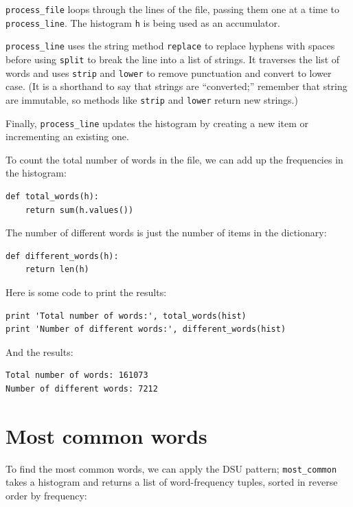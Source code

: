 
\verb"process_file" loops through the lines of the file,
passing them one at a time to \verb"process_line".  The histogram
{\tt h} is being used as an accumulator.


\verb"process_line" uses the string method {\tt replace} to replace
hyphens with spaces before using {\tt split} to break the line into a
list of strings.  It traverses the list of words and uses {\tt strip}
and {\tt lower} to remove punctuation and convert to lower case.  (It
is a shorthand to say that strings are ``converted;'' remember that
string are immutable, so methods like {\tt strip} and {\tt lower}
return new strings.)

Finally, \verb"process_line" updates the histogram by creating a new
item or incrementing an existing one.


To count the total number of words in the file, we can add up
the frequencies in the histogram:

\beforeverb
\begin{verbatim}
def total_words(h):
    return sum(h.values())
\end{verbatim}
\afterverb
%
The number of different words is just the number of items in
the dictionary:

\beforeverb
\begin{verbatim}
def different_words(h):
    return len(h)
\end{verbatim}
\afterverb
%
Here is some code to print the results:

\beforeverb
\begin{verbatim}
print 'Total number of words:', total_words(hist)
print 'Number of different words:', different_words(hist)
\end{verbatim}
\afterverb
%
And the results:

\beforeverb
\begin{verbatim}
Total number of words: 161073
Number of different words: 7212
\end{verbatim}
\afterverb
%

\section{Most common words}


To find the most common words, we can apply the DSU pattern;
\verb"most_common" takes a histogram and returns a list of
word-frequency tuples, sorted in reverse order by frequency:

